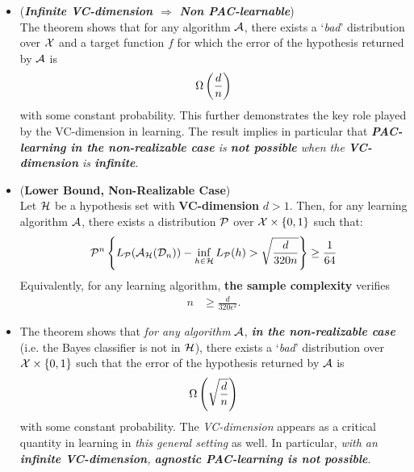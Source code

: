 \documentclass[11pt]{article}
\begin{document}
\begin{itemize}
\item \begin{remark} (\emph{\textbf{Infinite VC-dimension $\Rightarrow$ Non PAC-learnable}})\\
The theorem shows that for any algorithm ${\mathcal A}$, there exists a `\emph{bad}' distribution over ${\mathcal X}$ and a target function $f$ for which the error of the hypothesis returned by ${\mathcal A}$ is
\begin{align*}
\Omega\left(\frac{d}{n}\right)
\end{align*} with some constant probability. This further demonstrates the key role played by the VC-dimension in learning. The result implies in particular that \emph{\textbf{PAC-learning in the non-realizable case} is \textbf{not possible} when the \textbf{VC-dimension} is \textbf{infinite}}.
\end{remark}

\item \begin{proposition} (\textbf{Lower Bound, Non-Realizable Case}) \citep{mohri2018foundations} \\
Let ${\mathcal H}$ be a hypothesis set with \textbf{VC-dimension} $d > 1$. Then, for any learning algorithm ${\mathcal A}$, there exists a distribution ${\mathcal P}$ over ${\mathcal X} \times \left\{0, 1\right\}$ such that:
\begin{align*}
{\mathcal P}^{n}\left\{L_{{\mathcal P}}({\mathcal A}_{{\mathcal H}}({\mathcal D}_n)) - \inf_{h  \in {\mathcal H}}L_{{\mathcal P}}(h)  > \sqrt{\frac{d}{320 n}}\right\} \ge \frac{1}{64}
\end{align*} Equivalently, for any learning algorithm, \textbf{the sample complexity} verifies
\begin{align*}
n &\ge \frac{d}{320 \epsilon^2}.
\end{align*}
\end{proposition}

\item \begin{remark}
The theorem shows that \emph{for any algorithm} ${\mathcal A}$, \emph{\textbf{in the non-realizable case}} (i.e. the Bayes classifier is not in ${\mathcal H}$), there exists
a `\emph{bad}' distribution over ${\mathcal X} \times \left\{0, 1\right\}$ such that the error of the hypothesis returned by ${\mathcal A}$ is
\begin{align*}
\Omega\left(\sqrt{\frac{d}{n}}\right)
\end{align*} with some constant probability. The \emph{VC-dimension} appears as a critical quantity in learning in \emph{this general setting} as well. In particular, \emph{with an \textbf{infinite VC-dimension}, \textbf{agnostic PAC-learning is not possible}}.
\end{remark}
\end{itemize}


\newpage


\end{document}
